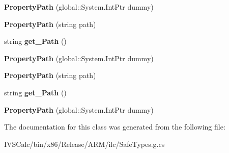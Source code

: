 \begin{DoxyCompactItemize}
\mbox{\label{class_windows_1_1_u_i_1_1_xaml_1_1_property_path_a1405aa71b886c9bb7e0cf278784696c5}} 
{\bfseries Property\+Path} (global\+::\+System.\+Int\+Ptr dummy)
\item 
\mbox{\label{class_windows_1_1_u_i_1_1_xaml_1_1_property_path_a07f41144ac303aa3ce1859c6e5c88e01}} 
{\bfseries Property\+Path} (string path)
\item 
\mbox{\label{class_windows_1_1_u_i_1_1_xaml_1_1_property_path_a9e59184bc1f06d94f319f1ea6a274ca8}} 
string {\bfseries get\+\_\+\+Path} ()
\item 
\mbox{\label{class_windows_1_1_u_i_1_1_xaml_1_1_property_path_a1405aa71b886c9bb7e0cf278784696c5}} 
{\bfseries Property\+Path} (global\+::\+System.\+Int\+Ptr dummy)
\item 
\mbox{\label{class_windows_1_1_u_i_1_1_xaml_1_1_property_path_a07f41144ac303aa3ce1859c6e5c88e01}} 
{\bfseries Property\+Path} (string path)
\item 
\mbox{\label{class_windows_1_1_u_i_1_1_xaml_1_1_property_path_a9e59184bc1f06d94f319f1ea6a274ca8}} 
string {\bfseries get\+\_\+\+Path} ()
\item 
\mbox{\label{class_windows_1_1_u_i_1_1_xaml_1_1_property_path_a1405aa71b886c9bb7e0cf278784696c5}} 
{\bfseries Property\+Path} (global\+::\+System.\+Int\+Ptr dummy)
\end{DoxyCompactItemize}


The documentation for this class was generated from the following file\+:\begin{DoxyCompactItemize}
\item 
I\+V\+S\+Calc/bin/x86/\+Release/\+A\+R\+M/ilc/Safe\+Types.\+g.\+cs\end{DoxyCompactItemize}
